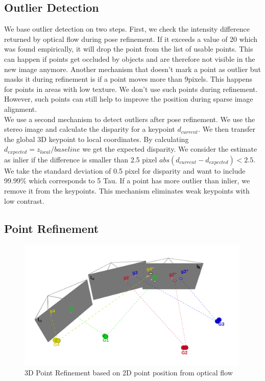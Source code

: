 \documentclass[11pt,a4paper,titlepage,oneside]{report}
\begin{document}
\subsection{Outlier Detection}
We base outlier detection on two steps. First, we check the intensity difference returned by optical flow during pose refinement. If it exceeds a value of 20 which was found empirically, it will drop the point from the list of usable points. This can happen if points get occluded by objects and are therefore not visible in the new image anymore. Another mechanism that doesn't mark a point as outlier but masks it during refinement is if a point moves more than 9pixels. This happens for points in areas with low texture. We don't use such points during refinement. However, such points can still help to improve the position during sparse image alignment.\\
We use a second mechanism to detect outliers after pose refinement. We use the stereo image and calculate the disparity for a keypoint $d_{current}$. We then transfer the global 3D keypoint to local coordinates. By calculating $d_{expected}=z_{local}/baseline$ we get the expected disparity. We consider the estimate as inlier if the difference is smaller than 2.5 pixel $abs(d_{current}-d_{expected})<2.5$. We take the standard deviation of 0.5 pixel for disparity and want to include 99.99\% which corresponds to 5 Tau. If a point has more outlier than inlier, we remove it from the keypoints. This mechanism eliminates weak keypoints with low contrast.

\subsection{Point Refinement}
\begin{figure}[H]
  \centering
  \includegraphics[width=0.99\textwidth]{img/pose_estimation_point_update.png}
  \caption{3D Point Refinement based on 2D point position from optical flow}
  \label{fig:point_update}
\end{figure}
\end{document}
